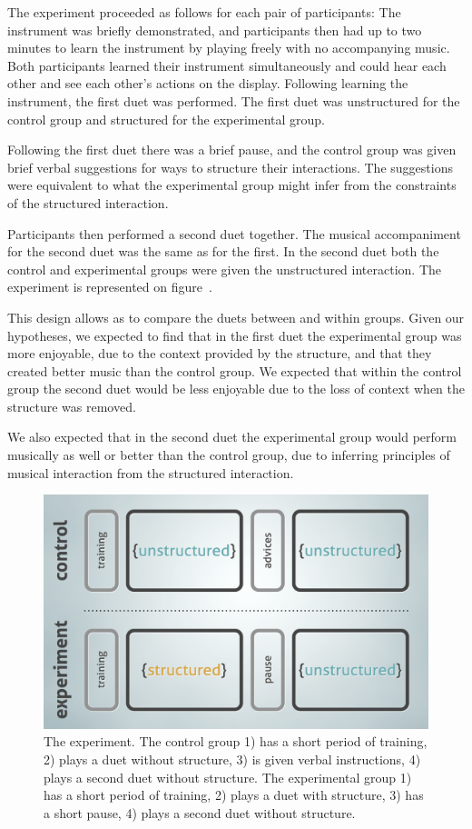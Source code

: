 \documentclass{article}
\begin{document}
The experiment proceeded as follows for each pair of participants: The instrument was briefly demonstrated, and participants then had up to two minutes to learn the instrument by playing freely with no accompanying music.  Both participants learned their instrument simultaneously and could hear each other and see each other’s actions on the display.  Following learning the instrument, the first duet was performed.  The first duet was unstructured for the control group and structured for the experimental group.
 
Following the first duet there was a brief pause, and the control group was given brief verbal suggestions for ways to structure their interactions.  The suggestions were equivalent to what the experimental group might infer from the constraints of the structured interaction.

Participants then performed a second duet together.  The musical accompaniment for the second duet was the same as for the first.  In the second duet both the control and experimental groups were given the unstructured interaction. The experiment is represented on figure~\cite{experiment}.

This design allows as to compare the duets between and within groups.  Given our hypotheses, we expected to find that in the first duet the experimental group was more enjoyable, due to the context provided by the structure, and that they created better music than the control group. We expected that within the control group the second duet would be less enjoyable due to the loss of context when the structure was removed.  

We also expected that in the second duet the experimental group would perform musically as well or better than the control group, due to inferring principles of musical interaction from the structured interaction.

\begin{figure}[tb]
\includegraphics[width=\columnwidth]{exp.png}
\caption{The experiment. The control group 1) has a short period of training, 2) plays a duet without structure, 3) is given verbal instructions, 4) plays a second duet without structure. The experimental group 1) has a short period of training, 2) plays a duet with structure, 3) has a short pause, 4) plays a second duet without structure.}
\label{experiment}
\end{figure}
\end{document}
